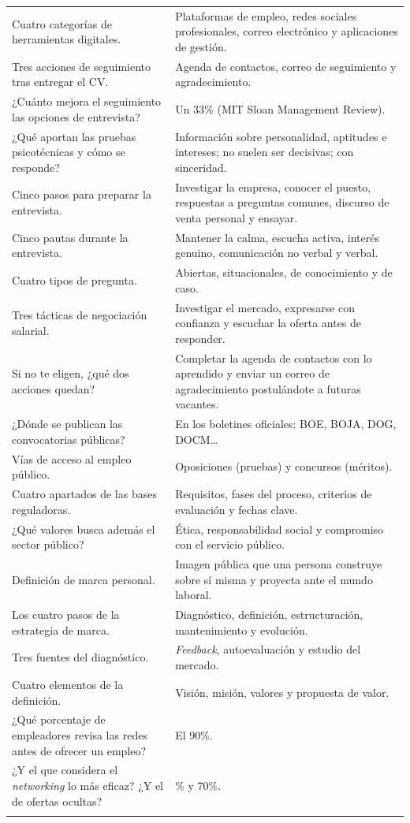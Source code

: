 \begin{tabla}
\begin{longtable}{@{}>{\raggedright\arraybackslash}p{7.6cm} >{\raggedright\arraybackslash}p{8.4cm}@{}}
Cuatro categorías de herramientas digitales. & Plataformas de empleo, redes sociales profesionales, correo electrónico y aplicaciones de gestión. \\
Tres acciones de seguimiento tras entregar el CV. & Agenda de contactos, correo de seguimiento y agradecimiento. \\
¿Cuánto mejora el seguimiento las opciones de entrevista? & Un 33\% (MIT Sloan Management Review). \\
¿Qué aportan las pruebas psicotécnicas y cómo se responde? & Información sobre personalidad, aptitudes e intereses; no suelen ser decisivas; con sinceridad. \\
Cinco pasos para preparar la entrevista. & Investigar la empresa, conocer el puesto, respuestas a preguntas comunes, discurso de venta personal y ensayar. \\
Cinco pautas durante la entrevista. & Mantener la calma, escucha activa, interés genuino, comunicación no verbal y verbal. \\
Cuatro tipos de pregunta. & Abiertas, situacionales, de conocimiento y de caso. \\
Tres tácticas de negociación salarial. & Investigar el mercado, expresarse con confianza y escuchar la oferta antes de responder. \\
Si no te eligen, ¿qué dos acciones quedan? & Completar la agenda de contactos con lo aprendido y enviar un correo de agradecimiento postulándote a futuras vacantes. \\
¿Dónde se publican las convocatorias públicas? & En los boletines oficiales: BOE, BOJA, DOG, DOCM… \\
Vías de acceso al empleo público. & Oposiciones (pruebas) y concursos (méritos). \\
Cuatro apartados de las bases reguladoras. & Requisitos, fases del proceso, criterios de evaluación y fechas clave. \\
¿Qué valores busca además el sector público? & Ética, responsabilidad social y compromiso con el servicio público. \\
Definición de marca personal. & Imagen pública que una persona construye sobre sí misma y proyecta ante el mundo laboral. \\
Los cuatro pasos de la estrategia de marca. & Diagnóstico, definición, estructuración, mantenimiento y evolución. \\
Tres fuentes del diagnóstico. & \emph{Feedback}, autoevaluación y estudio del mercado. \\
Cuatro elementos de la definición. & Visión, misión, valores y propuesta de valor. \\
¿Qué porcentaje de empleadores revisa las redes antes de ofrecer un empleo? & El 90\%. \\
¿Y el que considera el \emph{networking} lo más eficaz? ¿Y el de ofertas ocultas? & 85\% y 70\%. \\
\arrayrulecolor{inkmuted}\bottomrule
\end{longtable}
\end{tabla}

